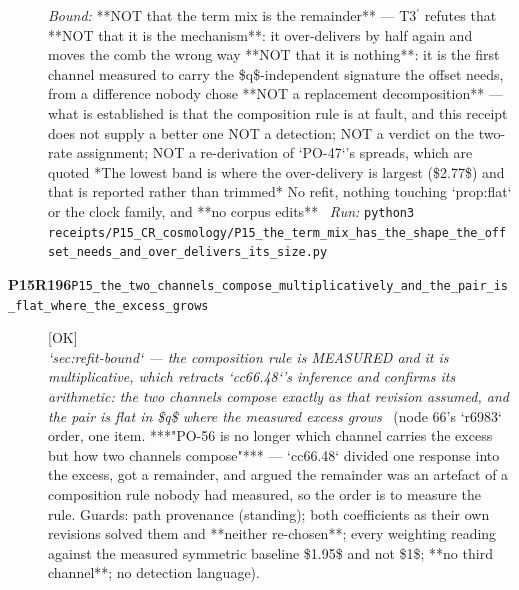 \begin{description}
 \emph{Bound:}  **NOT that the term mix is the remainder** --- T3\ensuremath{{}^\prime} refutes that  **NOT that it is the mechanism**: it over-delivers by half again and moves the comb the wrong way  **NOT that it is nothing**: it is the first channel measured to carry the \$q\$-independent signature the offset needs, from a difference nobody chose  **NOT a replacement decomposition** --- what is established is that the composition rule is at fault, and this receipt does not supply a better one  NOT a detection; NOT a verdict on the two-rate assignment; NOT a re-derivation of `PO-47`'s spreads, which are quoted  *The lowest band is where the over-delivery is largest (\$2.77\$) and that is reported rather than trimmed*  No refit, nothing touching `prop:flat` or the clock family, and **no corpus edits**
\ \emph{Run:} \texttt{python3 receipts/P15\_CR\_cosmology/P15\_the\_term\_mix\_has\_the\_shape\_the\_offset\_needs\_and\_over\_delivers\_its\_size.py}
\item[\rcptlabel{P15_the_two_channels_compose_multiplicatively_and_the_pair_is_flat_where_the_excess_grows}{P15R196}\textbf{P15R196}\quad\texttt{P15\_the\_two\_channels\_compose\_multiplicatively\_and\_the\_pair\_is\_flat\_where\_the\_excess\_grows}]\hfill\textsf{[OK]}\\
\textit{`sec:refit-bound` --- the composition rule is MEASURED and it is multiplicative, which retracts `cc66.48`'s inference and confirms its arithmetic: the two channels compose exactly as that revision assumed, and the pair is flat in \$q\$ where the measured excess grows} \ (node 66's `r6983` order, one item. ***"PO-56 is no longer which channel carries the excess but how two channels compose"*** --- `cc66.48` divided one response into the excess, got a remainder, and argued the remainder was an artefact of a composition rule nobody had measured, so the order is to measure the rule.  Guards: path provenance (standing); both coefficients as their own revisions solved them and **neither re-chosen**; every weighting reading against the measured symmetric baseline \$1.95\$ and not \$1\$; **no third channel**; no detection language). 

\end{description}
